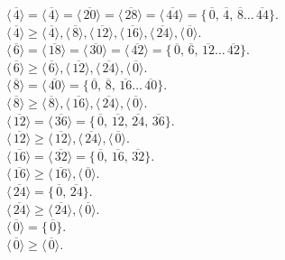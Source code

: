 \documentclass[12pt]{article}
\newcommand{\olsi}[1]{\,\overline{\!{#1}}}
\begin{document}
    $\langle \olsi{4} \rangle
    = \langle \olsi{4} \rangle = \langle \olsi{20} \rangle
    = \langle \olsi{28} \rangle = \langle \olsi{44} \rangle
    = \{\olsi{0}, \olsi{4}, \olsi{8} \dots \olsi{44}\}$. \\
    $\langle \olsi{4} \rangle \geqslant
    \langle \olsi{4} \rangle,
    \langle \olsi{8} \rangle,
    \langle \olsi{12} \rangle,
    \langle \olsi{16} \rangle,
    \langle \olsi{24} \rangle,
    \langle \olsi{0} \rangle$. \\
    $\langle \olsi{6} \rangle
    = \langle \olsi{18} \rangle = \langle \olsi{30} \rangle
    = \langle \olsi{42} \rangle
    = \{\olsi{0}, \olsi{6}, \olsi{12} \dots \olsi{42}\}$. \\
    $\langle \olsi{6} \rangle \geqslant
    \langle \olsi{6} \rangle,
    \langle \olsi{12} \rangle,
    \langle \olsi{24} \rangle,
    \langle \olsi{0} \rangle$. \\
    $\langle \olsi{8} \rangle
    = \langle \olsi{40} \rangle
    = \{\olsi{0}, \olsi{8}, \olsi{16} \dots \olsi{40}\}$. \\
    $\langle \olsi{8} \rangle \geqslant
    \langle \olsi{8} \rangle,
    \langle \olsi{16} \rangle,
    \langle \olsi{24} \rangle,
    \langle \olsi{0} \rangle$. \\
    $\langle \olsi{12} \rangle
    = \langle \olsi{36} \rangle
    = \{\olsi{0}, \olsi{12}, \olsi{24}, \olsi{36}\}$. \\
    $\langle \olsi{12} \rangle \geqslant
    \langle \olsi{12} \rangle,
    \langle \olsi{24} \rangle,
    \langle \olsi{0} \rangle$. \\
    $\langle \olsi{16} \rangle
    = \langle \olsi{32} \rangle
    = \{\olsi{0}, \olsi{16}, \olsi{32}\}$. \\
    $\langle \olsi{16} \rangle \geqslant
    \langle \olsi{16} \rangle,
    \langle \olsi{0} \rangle$. \\
    $\langle \olsi{24} \rangle
    = \{\olsi{0}, \olsi{24}\}$. \\
    $\langle \olsi{24} \rangle \geqslant
    \langle \olsi{24} \rangle,
    \langle \olsi{0} \rangle$. \\
    $\langle \olsi{0} \rangle
    = \{\olsi{0}\}$. \\
    $\langle \olsi{0} \rangle \geqslant
    \langle \olsi{0} \rangle$. \\
    
\end{document}

